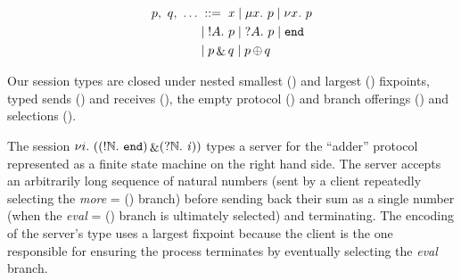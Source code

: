 \documentclass{easychair}
\begin{document}
\noindent
\begin{wrapfigure}[25]{r}{.38\textwidth}\centering%
  \vspace{-1cm}%
  \begin{align*}%
  p,~ q,~ \dots &
    \; ::= \; \recvar{x}
    \; | \; \smallest{x}{p}
    \; | \; \largest{x}{p} \\
    &
    \; | \; \send{A}{p}
    \; | \; \recv{A}{p}
    \; | \; \stopsesh{} \\
    &
    \; | \; \offer{p}{q}
    \; | \; \select{p}{q}
  \end{align*}

  \vspace{.4cm}


  \vspace{.4cm}

\end{wrapfigure}
%
Our session types are closed under
nested smallest () and largest () fixpoints,
typed sends () and receives (),
the empty protocol (\stopsesh{})
and branch offerings (\offer{\cdot}{\cdot}) and selections (\select{\cdot}{\cdot}).

The session
$
\nu i.~((!\mathbb{N}.~\mathtt{end}) \mathop{\&} (?\mathbb{N}.~\mathit{i}))
$
types a server for the ``adder'' protocol represented as
a finite state machine on the right hand side.
%
The server accepts an arbitrarily long sequence of natural numbers
(sent by a client repeatedly selecting the
\emph{more} = () branch)
before sending back their sum as a single number
(when the \emph{eval} = (\send{\nat}{\stopsesh}) branch is ultimately selected)
and terminating.
%
The encoding of the server's type uses a largest fixpoint
because the client is the one responsible
for ensuring the process terminates by eventually selecting
the \emph{eval} branch.
\end{document}
